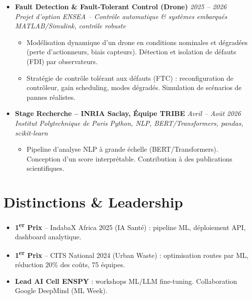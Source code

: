 \documentclass[a4paper,11pt]{article}
\begin{document}
\begin{itemize}[leftmargin=*, label={-}]
\item \textbf{Fault Detection \& Fault-Tolerant Control (Drone)} \hfill \textit{2025 -- 2026} \\
\textit{Projet d'option ENSEA -- Contrôle automatique \& systèmes embarqués} \hfill \textit{MATLAB/Simulink, contrôle robuste}
\vspace{-2pt}
    \begin{itemize}[leftmargin=0.4cm, nosep, label=\tiny$\bullet$]
        \item \small{Modélisation dynamique d'un drone en conditions nominales et dégradées (perte d'actionneurs, biais capteurs). Détection et isolation de défauts (FDI) par observateurs.}
        \item \small{Stratégie de contrôle tolérant aux défauts (FTC) : reconfiguration de contrôleur, gain scheduling, modes dégradés. Simulation de scénarios de pannes réalistes.}
    \end{itemize}
\vspace{3pt}

\item \textbf{Stage Recherche -- INRIA Saclay, Équipe TRIBE} \hfill \textit{Avril -- Août 2026} \\
\textit{Institut Polytechnique de Paris} \hfill \textit{Python, NLP, BERT/Transformers, pandas, scikit-learn}
\vspace{-2pt}
    \begin{itemize}[leftmargin=0.4cm, nosep, label=\tiny$\bullet$]
        \item \small{Pipeline d'analyse NLP à grande échelle (BERT/Transformers). Conception d'un score interprétable. Contribution à des publications scientifiques.}
    \end{itemize}
\vspace{3pt}

\end{itemize}

\section{Distinctions \& Leadership}
\begin{itemize}[leftmargin=*, nosep, label=\tiny$\bullet$]
    \item \small{\textbf{1\textsuperscript{er} Prix} -- IndabaX Africa 2025 (IA Santé) : pipeline ML, déploiement API, dashboard analytique.}
    \item \small{\textbf{1\textsuperscript{er} Prix} -- CITS National 2024 (Urban Waste) : optimisation routes par ML, réduction 20\% des coûts, 75 équipes.}
    \item \small{\textbf{Lead AI Cell ENSPY} : workshops ML/LLM fine-tuning. Collaboration Google DeepMind (ML Week).}
\end{itemize}
\end{document}
